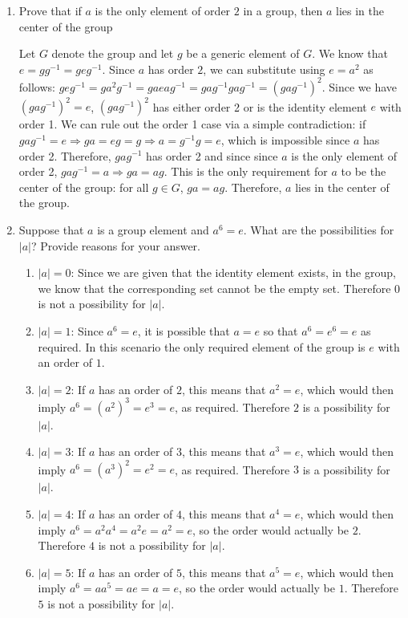 \documentclass{article}
\begin{document}
\begin{enumerate}
\begin{flushleft}
    \end{flushleft}
    \item Prove that if $a$ is the only element of order $2$ in a group, then $a$ lies in the center of the group
    \begin{flushleft}
    Let $G$ denote the group and let $g$ be a generic element of $G$. We know that $e = gg^{-1} = geg^{-1}$. Since $a$ has order $2$, we can substitute using $e = a^2$ as follows: $geg^{-1} = ga^2g^{-1} = gaeag^{-1} = gag^{-1}gag^{-1} = (gag^{-1})^2$. Since we have $(gag^{-1})^2 = e$, $(gag^{-1})^2$ has either order 2 or is the identity element $e$ with order 1. We can rule out the order 1 case via a simple contradiction: if $gag^{-1} = e \Rightarrow ga = eg = g \Rightarrow a = g^{-1}g = e$, which is impossible since $a$ has order 2. Therefore, $gag^{-1}$ has order 2 and since since $a$ is the only element of order 2, $gag^{-1} = a \Rightarrow ga = ag$. This is the only requirement for $a$ to be the center of the group: for all $g \in G$, $ga = ag$. Therefore, $a$ lies in the center of the group.
    \end{flushleft}
    \item Suppose that $a$ is a group element and $a^6 = e$. What are the possibilities for $|a|$? Provide reasons for your answer.
    \begin{enumerate}
        \item $|a| = 0$: Since we are given that the identity element exists, in the group, we know that the corresponding set cannot be the empty set. Therefore $0$ is not a possibility for $|a|$.
        \item $|a| = 1$: Since $a^6 = e$, it is possible that $a = e$ so that $a^6 = e^6 = e$ as required. In this scenario the only required element of the group is $e$ with an order of $1$.
        \item $|a| = 2$: If $a$ has an order of $2$, this means that $a^2 = e$, which would then imply $a^6 = (a^2)^3 = e^3 = e$, as required. Therefore $2$ is a possibility for $|a|$.
        \item $|a| = 3$: If $a$ has an order of $3$, this means that $a^3 = e$, which would then imply $a^6 = (a^3)^2 = e^2 = e$, as required. Therefore $3$ is a possibility for $|a|$.
        \item $|a| = 4$: If $a$ has an order of $4$, this means that $a^4 = e$, which would then imply $a^6 = a^2a^4 = a^2e = a^2 = e$, so the order would actually be $2$. Therefore $4$ is not a possibility for $|a|$.
        \item $|a| = 5$: If $a$ has an order of $5$, this means that $a^5 = e$, which would then imply $a^6 = aa^5 = ae = a = e$, so the order would actually be $1$. Therefore $5$ is not a possibility for $|a|$.

\end{enumerate}
\end{enumerate}
\end{document}
